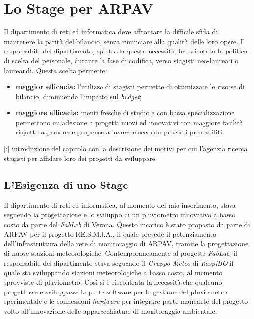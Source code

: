 \chapter{Lo Stage per ARPAV}
\label{2.0}
\thispagestyle{fancy} 

Il dipartimento di reti ed informatica deve affrontare la difficile sfida di mantenere la parità del bilancio, senza rinunciare alla qualità delle loro opere. Il responsabile del dipartimento, spinto da questa necessità, ha orientato la politica di scelta del personale, durante la fase di codifica, verso stagisti neo-laureati o laureandi. Questa scelta permette:

\begin{itemize}

	\item \textbf{maggior efficacia:} l'utilizzo di stagisti permette di ottimizzare le risorse di bilancio, diminuendo l'impatto sul \textit{budget};
	\item \textbf{maggiore efficacia:} menti fresche di studio e con bassa specializzazione permettono un'adesione a progetti nuovi ed innovativi con maggiore facilità rispetto a personale propenso a lavorare secondo processi prestabiliti.

\end{itemize}

[:] introduzione del capitolo con la descrizione dei motivi per cui l'agenzia ricerca stagisti per affidare loro dei progetti da sviluppare.

\section{L'Esigenza di uno Stage}

Il dipartimento di reti ed informatica, al momento del mio inserimento, stava seguendo la progettazione e lo sviluppo di un pluviometro innovativo a basso costo da parte del \textit{FabLab} di Verona. Questo incarico è stato proposto da parte di ARPAV per il progetto RE.S.M.I.A., il quale prevede il potenziamento dell'infrastruttura della rete di monitoraggio di ARPAV, tramite la progettazione di nuove stazioni meteorologiche.
Contemporaneamente al progetto \textit{FabLab}, il responsabile del dipartimento stava seguendo il \textit{Gruppo Meteo} di \textit{RaspiBO} il quale sta sviluppando stazioni meteorologiche a basso costo, al momento sprovviste di pluviometro. Così si è riscontrata la necessità che qualcuno progettasse e sviluppasse la parte software per la gestione del pluviometro sperimentale e le connessioni \textit{hardware} per integrare parte mancante del progetto volto all'innovazione delle apparecchiature di monitoraggio ambientale.


